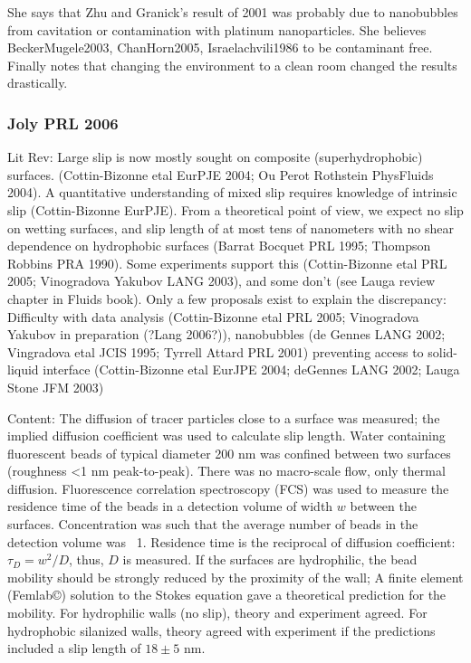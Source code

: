 \documentclass[twocolumn]{article}
\begin{document}
She says that Zhu and Granick's result of 2001 was probably due to nanobubbles from cavitation or contamination with platinum nanoparticles. She believes BeckerMugele2003, ChanHorn2005, Israelachvili1986 to be contaminant free.  Finally notes that changing the environment to a clean room changed the results drastically.


\subsubsection*{Joly PRL 2006}
Lit Rev: Large slip is now mostly sought on composite (superhydrophobic) surfaces. (Cottin-Bizonne etal EurPJE 2004; Ou Perot Rothstein PhysFluids 2004). A quantitative understanding of mixed slip requires knowledge of intrinsic slip (Cottin-Bizonne EurPJE). From a theoretical point of view, we expect no slip on wetting surfaces, and slip length of at most tens of nanometers with no shear dependence on hydrophobic surfaces (Barrat Bocquet PRL 1995; Thompson Robbins PRA 1990). Some experiments support this (Cottin-Bizonne etal PRL 2005; Vinogradova Yakubov LANG 2003), and some don't (see Lauga review chapter in Fluids book). Only a few proposals exist to explain the discrepancy: Difficulty with data analysis (Cottin-Bizonne etal PRL 2005; Vinogradova Yakubov in preparation (?Lang 2006?)), nanobubbles (de Gennes LANG 2002; Vingradova etal JCIS 1995; Tyrrell Attard PRL 2001) preventing access to solid-liquid interface (Cottin-Bizonne etal EurJPE 2004; deGennes LANG 2002; Lauga Stone JFM 2003)

Content: The diffusion of tracer particles close to a surface was measured; the implied  diffusion coefficient was used to calculate slip length. Water containing fluorescent beads of typical diameter 200 nm was confined between two surfaces (roughness <1 nm peak-to-peak). There was no macro-scale flow, only thermal diffusion. Fluorescence correlation spectroscopy (FCS) was used to measure the residence time of the beads in a detection volume of width $w$ between the surfaces. Concentration was such that the average number of beads in the detection volume was ~1. Residence time is the reciprocal of diffusion coefficient: $\tau_{D} = w^{2} / D$, thus, $D$ is measured. If the surfaces are hydrophilic, the bead mobility should be strongly reduced by the proximity of the wall; A finite element (Femlab\copyright) solution to the Stokes equation gave a theoretical prediction for the mobility. For hydrophilic walls (no slip), theory and experiment agreed. For hydrophobic silanized walls, theory agreed with experiment if the predictions included a slip length of $18 \pm 5$ nm.
\end{document}
